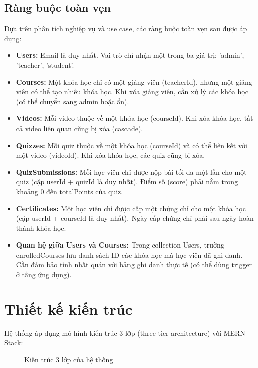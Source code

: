 \subsection{Ràng buộc toàn vẹn}
Dựa trên phân tích nghiệp vụ và use case, các ràng buộc toàn vẹn sau được áp dụng:
\begin{itemize}
    \item \textbf{Users:} Email là duy nhất. Vai trò chỉ nhận một trong ba giá trị: 'admin', 'teacher', 'student'.
    \item \textbf{Courses:} Một khóa học chỉ có một giảng viên (teacherId), nhưng một giảng viên có thể tạo nhiều khóa học. Khi xóa giảng viên, cần xử lý các khóa học (có thể chuyển sang admin hoặc ẩn).
    \item \textbf{Videos:} Mỗi video thuộc về một khóa học (courseId). Khi xóa khóa học, tất cả video liên quan cũng bị xóa (cascade).
    \item \textbf{Quizzes:} Mỗi quiz thuộc về một khóa học (courseId) và có thể liên kết với một video (videoId). Khi xóa khóa học, các quiz cũng bị xóa.
    \item \textbf{QuizSubmissions:} Mỗi học viên chỉ được nộp bài tối đa một lần cho một quiz (cặp userId + quizId là duy nhất). Điểm số (score) phải nằm trong khoảng 0 đến totalPoints của quiz.
    \item \textbf{Certificates:} Một học viên chỉ được cấp một chứng chỉ cho một khóa học (cặp userId + courseId là duy nhất). Ngày cấp chứng chỉ phải sau ngày hoàn thành khóa học.
    \item \textbf{Quan hệ giữa Users và Courses:} Trong collection Users, trường enrolledCourses lưu danh sách ID các khóa học mà học viên đã ghi danh. Cần đảm bảo tính nhất quán với bảng ghi danh thực tế (có thể dùng trigger ở tầng ứng dụng).
\end{itemize}
\section{Thiết kế kiến trúc}
Hệ thống áp dụng mô hình kiến trúc 3 lớp (three-tier architecture) với MERN Stack:

\begin{figure}[H]
\centering
{}
\caption{Kiến trúc 3 lớp của hệ thống}
\label{fig:architecture}
\end{figure}

